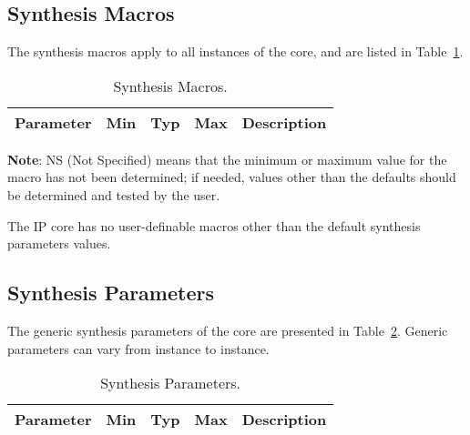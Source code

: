 \subsection{Synthesis Macros}

\ifdefined\SM

The synthesis macros apply to all instances of the core, and are listed in
Table~\ref{tab:sm}.

\begin{table}[h]
  \centering
    \begin{tabularx}{\textwidth}{ | c | c | c | c | X | }
    \hline
    \rowcolor{iob-green}
    {\bf Parameter} & {\bf Min} & {\bf Typ} & {\bf Max} & {\bf Description} \\\hline

    

    \end{tabularx}
  \caption{Synthesis Macros.}
  \label{tab:sm}
\end{table}

\noindent
\small{{\bf Note}: NS (Not Specified) means that the minimum or maximum value
  for the macro has not been determined; if needed, values other than the
  defaults should be determined and tested by the user.}

\else
The IP core has no user-definable macros other than the default synthesis parameters values.
\fi


\subsection{Synthesis Parameters}

\ifdefined\SP

The generic synthesis parameters of the core are presented in
Table~\ref{tab:sp}. Generic parameters can vary from instance to instance.

\begin{table}[h]
  \centering
    \begin{tabularx}{\textwidth}{ | c | c | c | c | X | }
    \hline
    \rowcolor{iob-green}
    {\bf Parameter} & {\bf Min} & {\bf Typ} & {\bf Max} & {\bf Description} \\\hline

    

    \end{tabularx}
    
\caption{Synthesis Parameters.}
  \label{tab:sp}
\end{table}

